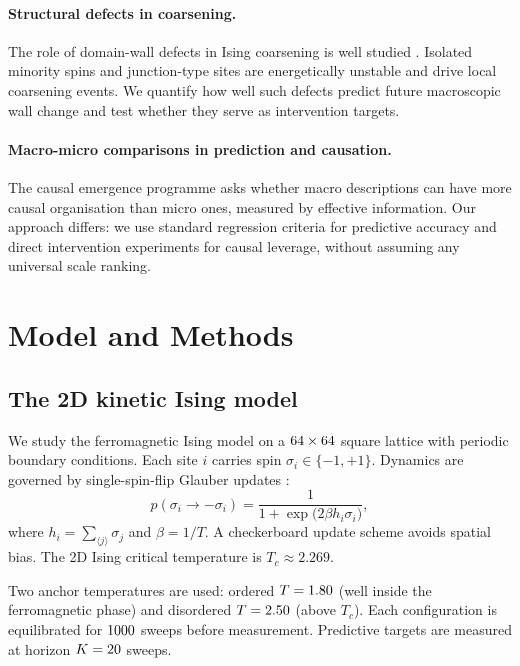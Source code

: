 \documentclass[aps,pre,preprint,superscriptaddress,showpacs]{revtex4-2}
\begin{document}
\paragraph{Structural defects in coarsening.}
The role of domain-wall defects in Ising coarsening is well studied
\cite{bray1994,spirin2001}.
Isolated minority spins and junction-type sites are energetically
unstable and drive local coarsening events.
We quantify how well such defects predict future macroscopic wall change
and test whether they serve as intervention targets.

\paragraph{Macro-micro comparisons in prediction and causation.}
The causal emergence programme \cite{hoel2013,hoel2017} asks whether
macro descriptions can have more causal organisation than micro ones,
measured by effective information.
Our approach differs: we use standard regression criteria for predictive
accuracy and direct intervention experiments for causal leverage, without
assuming any universal scale ranking.

\section{Model and Methods}
\label{sec:model}

\subsection{The 2D kinetic Ising model}

We study the ferromagnetic Ising model on a
$64 \times 64$ square lattice with periodic boundary conditions.
Each site $i$ carries spin $\sigma_i \in \{-1,+1\}$.
Dynamics are governed by single-spin-flip Glauber updates \cite{glauber1963}:
\begin{equation}
p(\sigma_i \to -\sigma_i)
= \frac{1}{1 + \exp\!\bigl(2\beta h_i \sigma_i\bigr)},
\label{eq:glauber}
\end{equation}
where $h_i = \sum_{\langle j\rangle}\sigma_j$ and $\beta = 1/T$.
A checkerboard update scheme avoids spatial bias.
The 2D Ising critical temperature is $T_c \approx 2.269$.

Two anchor temperatures are used: ordered $T = 1.80$ (well inside
the ferromagnetic phase) and disordered $T = 2.50$ (above $T_c$).
Each configuration is equilibrated for $1000$ sweeps before measurement.
Predictive targets are measured at horizon $K = 20$ sweeps.
\end{document}
